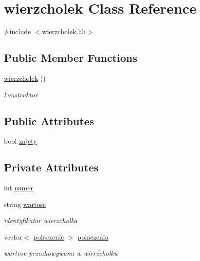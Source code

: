 \hypertarget{classwierzcholek}{\section{wierzcholek \-Class \-Reference}
\label{classwierzcholek}
}


{\ttfamily \#include $<$wierzcholek.\-hh$>$}

\subsection*{\-Public \-Member \-Functions}
\begin{DoxyCompactItemize}
\item 
\hyperlink{classwierzcholek_a0e72695b032e7f750c51041e1a59673b}{wierzcholek} ()
\begin{DoxyCompactList}\small\item\em konstruktor \end{DoxyCompactList}\end{DoxyCompactItemize}
\subsection*{\-Public \-Attributes}
\begin{DoxyCompactItemize}
\item 
bool \hyperlink{classwierzcholek_ad67644b5f408397f28d7150d3bac76d2}{zajety}
\end{DoxyCompactItemize}
\subsection*{\-Private \-Attributes}
\begin{DoxyCompactItemize}
\item 
int \hyperlink{classwierzcholek_a66aaea6b1187250f7100542adc1617d2}{numer}
\item 
string \hyperlink{classwierzcholek_a19aa16bf7e01a987fcc360e5da902209}{wartosc}
\begin{DoxyCompactList}\small\item\em identyfikator wierzcholka \end{DoxyCompactList}\item 
vector$<$ \hyperlink{structpolaczenie}{polaczenie} $>$ \hyperlink{classwierzcholek_ad6442177753c61769b0fa1822e75f551}{polaczenia}
\begin{DoxyCompactList}\small\item\em wartosc przechowywana w wierzcholku \end{DoxyCompactList}\end{DoxyCompactItemize}
